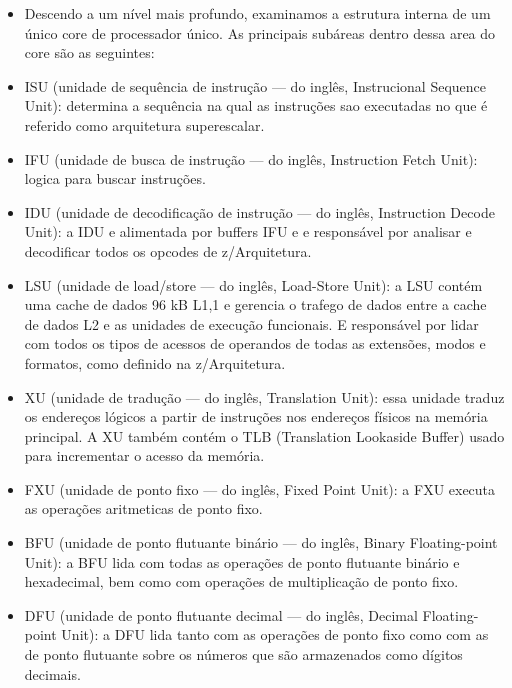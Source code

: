 \documentclass{article}
\begin{document}
\begin{itemize}
    \item Descendo a um nível mais profundo, examinamos a estrutura interna de
        um único core de processador único. As principais subáreas dentro dessa
        area do core são as seguintes:

    \item ISU (unidade de sequência de instrução — do inglês, Instrucional
        Sequence Unit): determina a sequência na qual as instruções sao
        executadas no que é referido como arquitetura superescalar.

    \item IFU (unidade de busca de instrução — do inglês, Instruction Fetch
        Unit): logica para buscar instruções.

    \item IDU (unidade de decodificação de instrução — do inglês, Instruction
        Decode Unit): a IDU e alimentada por buffers IFU e e responsável por
        analisar e decodificar todos os opcodes de z/Arquitetura.

    \item  LSU (unidade de load/store — do inglês, Load-Store Unit): a LSU
        contém uma cache de dados 96 kB L1,1 e gerencia o trafego de dados
        entre a cache de dados L2 e as unidades de execução funcionais. E
        responsável por lidar com todos os tipos de acessos de operandos de
        todas as extensões, modos e formatos, como definido na z/Arquitetura.

    \item XU (unidade de tradução — do inglês, Translation Unit): essa unidade
        traduz os endereços lógicos a partir de instruções nos endereços
        físicos na memória principal. A XU também contém o TLB (Translation
        Lookaside Buffer) usado para incrementar o acesso da memória.

    \item FXU (unidade de ponto fixo — do inglês, Fixed Point Unit): a FXU
        executa as operações aritmeticas de ponto fixo.

    \item BFU (unidade de ponto flutuante binário — do inglês, Binary
        Floating-point Unit): a BFU lida com todas as operações de ponto
        flutuante binário e hexadecimal, bem como com operações de
        multiplicação de ponto fixo.

    \item DFU (unidade de ponto flutuante decimal — do inglês, Decimal
        Floating-point Unit): a DFU lida tanto com as operações de ponto fixo
        como com as de ponto flutuante sobre os números que são armazenados
        como dígitos decimais.


\end{itemize}
\end{document}

